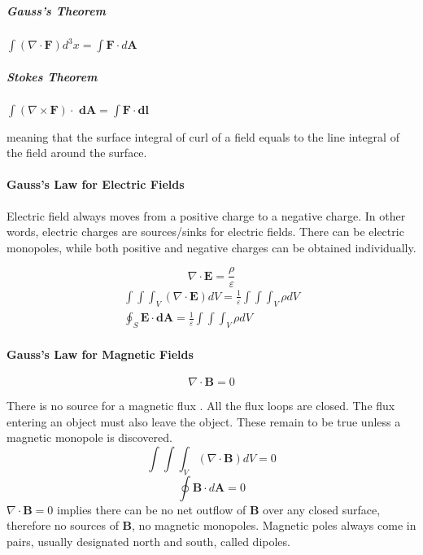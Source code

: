 \subparagraph{Gauss's Theorem} $\int (\nabla \cdot \textbf{F})d^{3}x = \int \textbf{F} \cdot d\textbf{A}$


\subparagraph{Stokes Theorem} $\int (\nabla \times \textbf{F}) \cdot \textbf{ dA} = \int \textbf{F} \cdot \textbf{dl}$

meaning that the surface integral of curl of a field equals to the line integral of the field around the surface.




\paragraph{Gauss's Law for Electric Fields}

Electric field always moves from a positive charge to a negative charge. In other words, electric charges are sources/sinks for electric fields. There can be electric monopoles, while both positive and negative charges can be obtained individually.

\begin{equation}
	\nabla \cdot \textbf{E} = \frac{\rho}{\varepsilon}
\end{equation}
\begin{eqnarray}
	\int \int \int_{V} (\nabla \cdot \textbf{E}) dV = \frac{1}{\varepsilon} \int \int \int_{V} \rho dV \\
	\oint_{S} \textbf{E} \cdot \textbf{dA} = \frac{1}{\varepsilon} \int \int \int_{V} \rho dV
\end{eqnarray}




\paragraph{Gauss's Law for Magnetic Fields}
\begin{equation}
	\nabla \cdot \textbf{B} = 0
\end{equation}

There is no source for a magnetic flux \cite{Pyrhonen}. All the flux loops are closed. The flux entering an object must also leave the object. These remain to be true unless a magnetic monopole is discovered.
\begin{equation}
	\int \int \int_{V} (\nabla \cdot \textbf{B}) dV = 0
\end{equation}
\begin{equation}
	\oint \textbf{B} \cdot d\textbf{A} = 0
\end{equation}
	 $\nabla \cdot \textbf{B} = 0$ implies there can be no net outflow of $\textbf{B}$ over any  closed surface, therefore no sources of $\textbf{B}$, no magnetic monopoles. Magnetic poles always come in pairs, usually designated north 
and south, called dipoles.



